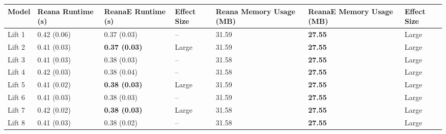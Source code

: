 \begin{tabular}{lllllll}
\toprule
  Model & Reana Runtime (s) &    ReanaE Runtime (s) & Effect Size & Reana Memory Usage (MB) & ReanaE Memory Usage (MB) & Effect Size \\
\midrule
 Lift 1 &       0.42 (0.06) &           0.37 (0.03) &          -- &                   31.59 &           \textbf{27.55} &       Large \\
 Lift 2 &       0.41 (0.03) &  \textbf{0.37 (0.03)} &       Large &                   31.59 &           \textbf{27.55} &       Large \\
 Lift 3 &       0.41 (0.03) &           0.38 (0.03) &          -- &                   31.58 &           \textbf{27.55} &       Large \\
 Lift 4 &       0.42 (0.03) &           0.38 (0.04) &          -- &                   31.58 &           \textbf{27.55} &       Large \\
 Lift 5 &       0.41 (0.02) &  \textbf{0.38 (0.03)} &       Large &                   31.59 &           \textbf{27.55} &       Large \\
 Lift 6 &       0.41 (0.03) &           0.38 (0.03) &          -- &                   31.59 &           \textbf{27.55} &       Large \\
 Lift 7 &       0.42 (0.02) &  \textbf{0.38 (0.03)} &       Large &                   31.58 &           \textbf{27.55} &       Large \\
 Lift 8 &       0.41 (0.03) &           0.38 (0.02) &          -- &                   31.58 &           \textbf{27.55} &       Large \\
\bottomrule
\end{tabular}
